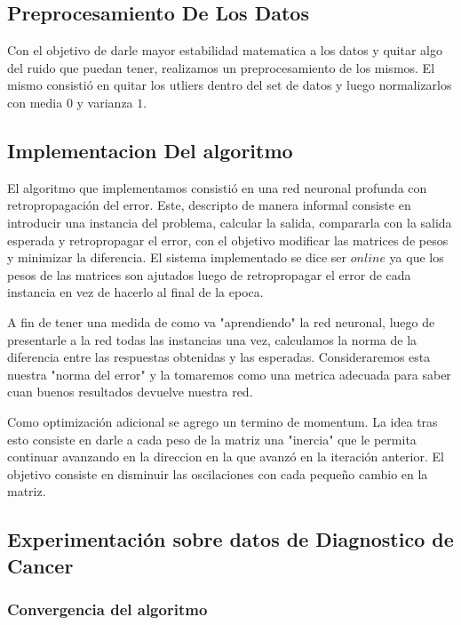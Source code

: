 \subsection{Preprocesamiento De Los Datos} 
Con el objetivo de darle mayor estabilidad matematica a los datos y quitar algo del ruido que puedan tener, realizamos un preprocesamiento de los mismos. El mismo consistió en quitar los utliers dentro del set de datos y luego normalizarlos con media $0$ y varianza $1$.

\subsection{Implementacion Del algoritmo} 

El algoritmo que implementamos consistió en una red neuronal profunda con retropropagación del error. Este, descripto de manera informal consiste en introducir una instancia del problema, calcular la salida, compararla con la salida esperada y retropropagar el error, con el objetivo modificar las matrices de pesos y minimizar la diferencia. El sistema implementado se dice ser $online$ ya que los pesos de las matrices son ajutados luego de retropropagar el error de cada instancia en vez de hacerlo al final de la epoca.

A fin de tener una medida de como va "aprendiendo" la red neuronal, luego de presentarle a la red todas las instancias una vez, calculamos la norma de la diferencia entre las respuestas obtenidas y las esperadas. Consideraremos esta nuestra "norma del error" y la tomaremos como una metrica adecuada para saber cuan buenos resultados devuelve nuestra red.



Como optimización adicional se agrego un termino de momentum. La idea tras esto consiste en darle a cada peso de la matriz una "inercia" que le permita continuar avanzando en la direccion en la que avanzó en la iteración anterior. El objetivo consiste en disminuir las oscilaciones con cada pequeño cambio en la matriz.

\subsection{Experimentación sobre datos de Diagnostico de Cancer}

\subsubsection{Convergencia del algoritmo} 

